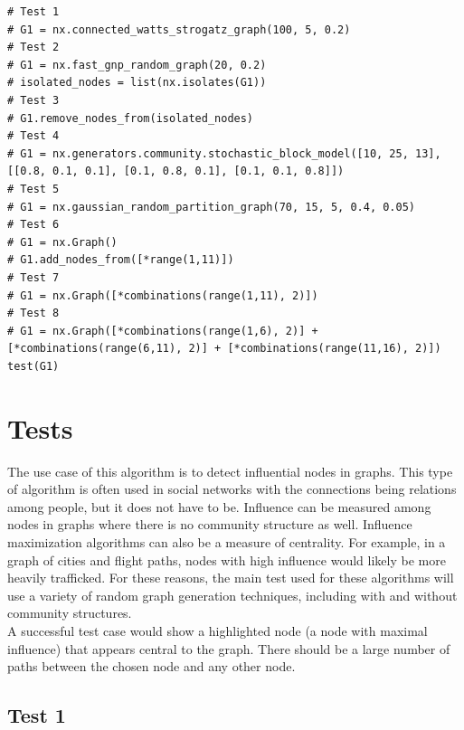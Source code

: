 \documentclass{article}
\begin{document}
\begin{verbatim}
# Test 1
# G1 = nx.connected_watts_strogatz_graph(100, 5, 0.2)
# Test 2
# G1 = nx.fast_gnp_random_graph(20, 0.2)
# isolated_nodes = list(nx.isolates(G1))
# Test 3
# G1.remove_nodes_from(isolated_nodes)
# Test 4
# G1 = nx.generators.community.stochastic_block_model([10, 25, 13], [[0.8, 0.1, 0.1], [0.1, 0.8, 0.1], [0.1, 0.1, 0.8]])
# Test 5
# G1 = nx.gaussian_random_partition_graph(70, 15, 5, 0.4, 0.05)
# Test 6
# G1 = nx.Graph()
# G1.add_nodes_from([*range(1,11)])
# Test 7
# G1 = nx.Graph([*combinations(range(1,11), 2)])
# Test 8
# G1 = nx.Graph([*combinations(range(1,6), 2)] + [*combinations(range(6,11), 2)] + [*combinations(range(11,16), 2)])
test(G1)

\end{verbatim}

\section{Tests}

The use case of this algorithm is to detect influential nodes in graphs.  This type of algorithm is often used in social networks with the connections being relations among people, but it does not have to be.  Influence can be measured among nodes in graphs where there is no community structure as well.  Influence maximization algorithms can also be a measure of centrality.  For example, in a graph of cities and flight paths, nodes with high influence would likely be more heavily trafficked.  For these reasons, the main test used for these algorithms will use a variety of random graph generation techniques, including with and without community structures. \\

A successful test case would show a highlighted node (a node with maximal influence) that appears central to the graph.  There should be a large number of paths between the chosen node and any other node. \\

\subsection{Test 1}
    \begin{center}
    \end{center}
\end{document}
